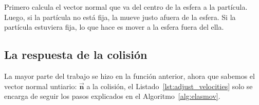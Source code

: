 
Primero calcula el vector normal que va del centro de la esfera a la partícula.
Luego, si la partícula no está fija, la mueve justo afuera de la esfera.
Si la partícula estuviera fija, lo que hace es mover a la esfera fuera del ella.

\subsection{La respuesta de la colisión}
La mayor parte del trabajo se hizo en la función anterior, ahora que sabemos el vector normal untiario: $\vec{\textbf{n}}$ a la colisión, el Listado~\ref{lst:adjust_velocities} solo se encarga de seguir los pasos explicados en el Algoritmo~\ref{alg:elasmov}.


